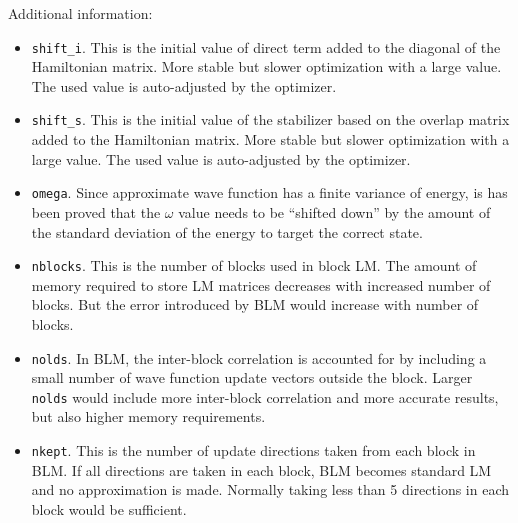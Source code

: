 Additional information:
\begin{itemize}
  \item \texttt{shift\_i}.  This is the initial value of direct term added to the diagonal of the Hamiltonian matrix. 
                            More stable but slower optimization with a large value. The used value is auto-adjusted by the optimizer. 
  \item \texttt{shift\_s}.  This is the initial value of the stabilizer based on the overlap matrix added to the Hamiltonian matrix. 
                            More stable but slower optimization with a large value. The used value is auto-adjusted by the optimizer. 
  \item \texttt{omega}.     Since approximate wave function has a finite variance of energy, is has been proved that the $\omega$ value
                            needs to be ``shifted down'' by the amount of the standard deviation of the energy to target the correct state. 
  \item \texttt{nblocks}.   This is the number of blocks used in block LM. The amount of memory required to store LM matrices decreases
                            with increased number of blocks. But the error introduced by BLM would increase with number of blocks.  
  \item \texttt{nolds}.     In BLM, the inter-block correlation is accounted for by including a small number of wave function update vectors
                            outside the block. Larger \texttt{nolds} would include more inter-block correlation and more accurate results, but 
                            also higher memory requirements. 
  \item \texttt{nkept}.     This is the number of update directions taken from each block in BLM. If all directions are taken in each block, 
                            BLM becomes standard LM and no approximation is made. Normally taking less than 5 directions in each block would 
                            be sufficient. 
                            
\end{itemize}


